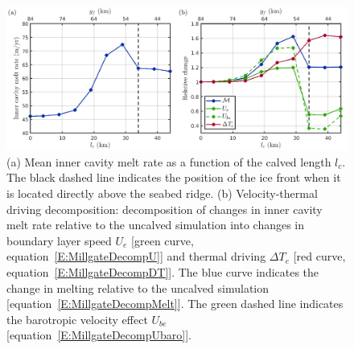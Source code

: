 \documentclass[draft]{agujournal2019}
\begin{document}
\begin{figure}
    \centering
    \includegraphics[width = \textwidth]{../make_figures/plots/figure4.png}
    \caption{(a) Mean inner cavity melt rate as a function of the calved length $l_c$. The black dashed line indicates the position of the ice front when it is located directly above the seabed ridge. (b) Velocity-thermal driving decomposition: decomposition of changes in inner cavity melt rate relative to the uncalved simulation into changes in boundary layer speed $U_e$ [green curve, equation~\eqref{E:MillgateDecompU}] and thermal driving $\Delta T_e$ [red curve, equation~\eqref{E:MillgateDecompDT}]. The blue curve indicates the change in melting relative to the uncalved simulation [equation~\eqref{E:MillgateDecompMelt}]. The green dashed line indicates the barotropic velocity effect $U_{be}$ [equation~\eqref{E:MillgateDecompUbaro}].  }
    \label{fig:figure4}
\end{figure}
\end{document}
